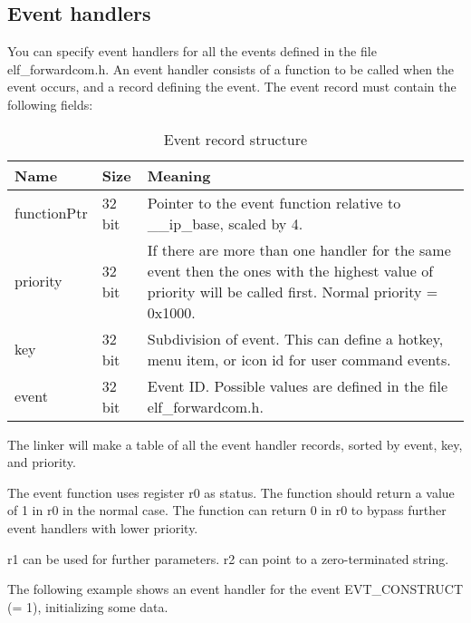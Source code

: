 \documentclass[forwardcom.tex]{subfiles}
\begin{document}
\vspace{2mm}

\subsection{Event handlers} \label{EventHandlers}
You can specify event handlers for all the events defined in the file elf\_forwardcom.h.
An event handler consists of a function to be called when the event occurs, and a record
defining the event. The event record must contain the following fields:

\begin{longtable} {|p{20mm}|p{15mm}|p{100mm}|}
\caption{Event record structure} 
\label{table:EventRecordStructure}\\
\endfirsthead
\endhead
\hline
\bfseries Name & \bfseries Size & \bfseries Meaning  \\
\hline
functionPtr & 32 bit & Pointer to the event function relative to \_\_ip\_base, scaled by 4.\\
\hline
priority    & 32 bit & If there are more than one handler for the same event then the ones with
the highest value of priority will be called first. 
Normal priority = 0x1000.\\
\hline
key         & 32 bit & Subdivision of event. This can define a hotkey, menu item, or icon id for user command events.\\
\hline
event       & 32 bit & Event ID. Possible values are defined in the file elf\_forwardcom.h.\\
\hline
\end{longtable}
\vspace{2mm}

The linker will make a table of all the event handler records, sorted by event, key, and priority.
\vspace{2mm}

The event function uses register r0 as status. The function should 
return a value of 1 in r0 in the normal case. The function can return 0 in r0 to bypass further 
event handlers with lower priority.
\vspace{2mm}

r1 can be used for further parameters. r2 can point to a zero-terminated string.
\vspace{2mm}

The following example shows an event handler for the event EVT\_CONSTRUCT (= 1), initializing some data.
\end{document}
